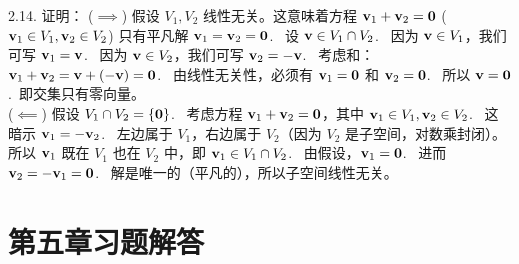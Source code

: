 \begin{exer}
2.14. 证明：
($\implies$) 假设 $V_1, V_2$ 线性无关。这意味着方程 $\mathbf{v}_1 + \mathbf{v}_2 = \mathbf{0}$ ($\mathbf{v}_1 \in V_1, \mathbf{v}_2 \in V_2$) 只有平凡解 $\mathbf{v}_1 = \mathbf{v}_2 = \mathbf{0}$.~
设 $\mathbf{v} \in V_1 \cap V_2$.~
因为 $\mathbf{v} \in V_1$，我们可写 $\mathbf{v}_1 = \mathbf{v}$.~
因为 $\mathbf{v} \in V_2$，我们可写 $\mathbf{v}_2 = -\mathbf{v}$.~
考虑和：$\mathbf{v}_1 + \mathbf{v}_2 = \mathbf{v} + (-\mathbf{v}) = \mathbf{0}$.~
由线性无关性，必须有 $\mathbf{v}_1 = \mathbf{0}$ 和 $\mathbf{v}_2 = \mathbf{0}$.~
所以 $\mathbf{v} = \mathbf{0}$.~即交集只有零向量。
\\
($\impliedby$) 假设 $V_1 \cap V_2 = \{\mathbf{0}\}$.~
考虑方程 $\mathbf{v}_1 + \mathbf{v}_2 = \mathbf{0}$，其中 $\mathbf{v}_1 \in V_1, \mathbf{v}_2 \in V_2$.~
这暗示 $\mathbf{v}_1 = -\mathbf{v}_2$.~
左边属于 $V_1$，右边属于 $V_2$（因为 $V_2$ 是子空间，对数乘封闭）。
所以 $\mathbf{v}_1$ 既在 $V_1$ 也在 $V_2$ 中，即 $\mathbf{v}_1 \in V_1 \cap V_2$.~
由假设，$\mathbf{v}_1 = \mathbf{0}$.~
进而 $\mathbf{v}_2 = -\mathbf{v}_1 = \mathbf{0}$.~
解是唯一的（平凡的），所以子空间线性无关。



\vspace{5ex}


\end{exer}








\section*{第五章习题解答}

